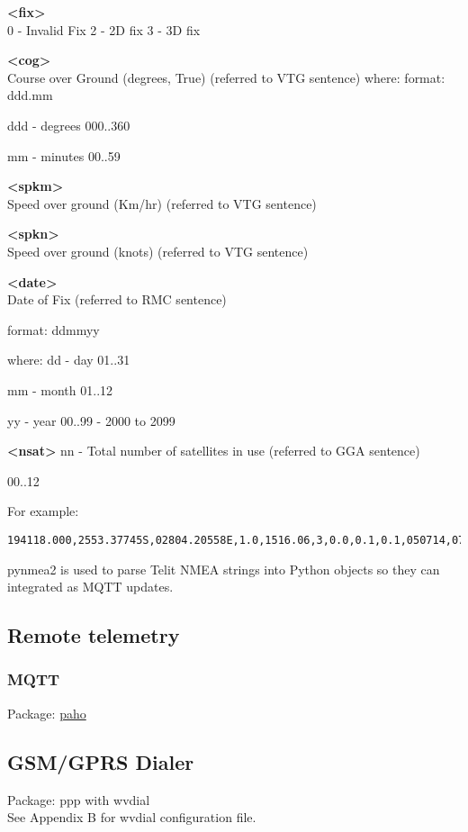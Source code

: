 \textbf{<fix>} \\
0 - Invalid Fix
2 - 2D fix
3 - 3D fix

\textbf{<cog>} \\
Course over Ground (degrees, True) (referred to VTG sentence) where:
format:
ddd.mm

ddd - degrees		 	 	 		
000..360

mm - minutes						
00..59


\textbf{<spkm>}\\
Speed over ground (Km/hr) (referred to VTG sentence)

\textbf{<spkn>} \\
Speed over ground (knots) (referred to VTG sentence)

\textbf{<date>} \\
Date of Fix (referred to RMC sentence)

format:
ddmmyy 
						
where:
dd - day					
01..31

mm - month					
01..12

yy - year						
00..99 - 2000 to 2099

\textbf{<nsat>}
nn - Total number of satellites in use (referred to GGA sentence)
						
00..12

For example:
\begin{lstlisting}
194118.000,2553.37745S,02804.20558E,1.0,1516.06,3,0.0,0.1,0.1,050714,07
\end{lstlisting}

pynmea2 is used to parse Telit NMEA strings into Python objects so they can integrated as MQTT updates.

\subsection{Remote telemetry}

\subsubsection{MQTT}
Package:	\href{https://eclipse.org/paho/clients/python/}{paho}\\

\subsection{GSM/GPRS Dialer}
Package: 	ppp with wvdial\\
See Appendix B for wvdial configuration file.

